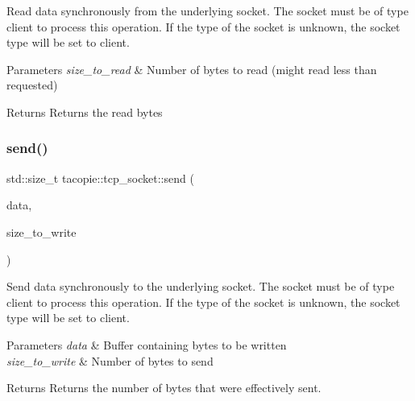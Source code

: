 Read data synchronously from the underlying socket. The socket must be of type client to process this operation. If the type of the socket is unknown, the socket type will be set to client.


\begin{DoxyParams}{Parameters}
{\em size\+\_\+to\+\_\+read} & Number of bytes to read (might read less than requested) \\
\hline
\end{DoxyParams}
\begin{DoxyReturn}{Returns}
Returns the read bytes 
\end{DoxyReturn}
\mbox{\label{classtacopie_1_1tcp__socket_a36521a8f502adc665ad0fb1c53583d04}} 
\subsubsection{\texorpdfstring{send()}{send()}}
{\footnotesize\ttfamily std\+::size\+\_\+t tacopie\+::tcp\+\_\+socket\+::send (\begin{DoxyParamCaption}\item[{const std\+::vector$<$ char $>$ \&}]{data,  }\item[{std\+::size\+\_\+t}]{size\+\_\+to\+\_\+write }\end{DoxyParamCaption})}

Send data synchronously to the underlying socket. The socket must be of type client to process this operation. If the type of the socket is unknown, the socket type will be set to client.


\begin{DoxyParams}{Parameters}
{\em data} & Buffer containing bytes to be written \\
\hline
{\em size\+\_\+to\+\_\+write} & Number of bytes to send \\
\hline
\end{DoxyParams}
\begin{DoxyReturn}{Returns}
Returns the number of bytes that were effectively sent. 
\end{DoxyReturn}
\mbox{\label{classtacopie_1_1tcp__socket_a89be86ab254eec3fc16eedfba8b16fb2}} 
